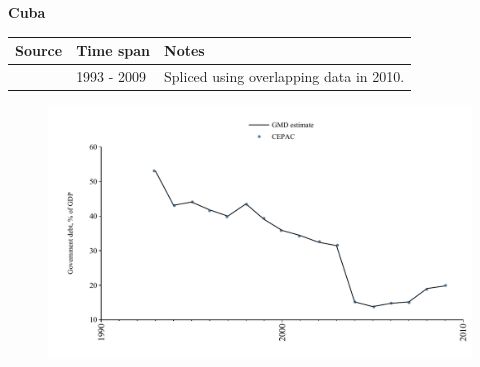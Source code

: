 \documentclass[12pt,a4paper,landscape]{article}
\begin{document}
\begin{adjustbox}{max totalsize={\paperwidth}{\paperheight},center}
\begin{minipage}[t][\textheight][t]{\textwidth}
\vspace*{0.5cm}
{}
\begin{center}
{\Large\bfseries Cuba}
\end{center}
\vspace{0.5cm}
\begin{table}[H]
\centering
\small
\begin{tabular}{|l|l|l|}
\hline
\textbf{Source} & \textbf{Time span} & \textbf{Notes} \\
\hline
\rowcolor{white}\cite{CEPAC}& 1993 - 2009 &Spliced using overlapping data in 2010.\\
\hline
\end{tabular}
\end{table}
\begin{figure}[H]
\centering
\includegraphics[width=\textwidth,height=0.6\textheight,keepaspectratio]{graphs/CUB_govdebt_GDP.pdf}
\end{figure}
\end{minipage}
\end{adjustbox}
\end{document}
